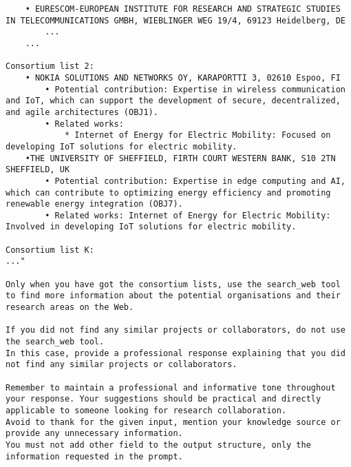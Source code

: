 \begin{lstlisting}
    • EURESCOM-EUROPEAN INSTITUTE FOR RESEARCH AND STRATEGIC STUDIES IN TELECOMMUNICATIONS GMBH, WIEBLINGER WEG 19/4, 69123 Heidelberg, DE
        ...
    ...

Consortium list 2:
    • NOKIA SOLUTIONS AND NETWORKS OY, KARAPORTTI 3, 02610 Espoo, FI
        • Potential contribution: Expertise in wireless communication and IoT, which can support the development of secure, decentralized, and agile architectures (OBJ1).
        • Related works:
            * Internet of Energy for Electric Mobility: Focused on developing IoT solutions for electric mobility.
    •THE UNIVERSITY OF SHEFFIELD, FIRTH COURT WESTERN BANK, S10 2TN SHEFFIELD, UK
        • Potential contribution: Expertise in edge computing and AI, which can contribute to optimizing energy efficiency and promoting renewable energy integration (OBJ7).
        • Related works: Internet of Energy for Electric Mobility: Involved in developing IoT solutions for electric mobility.
    
Consortium list K:
..."

Only when you have got the consortium lists, use the search_web tool to find more information about the potential organisations and their research areas on the Web. 

If you did not find any similar projects or collaborators, do not use the search_web tool.
In this case, provide a professional response explaining that you did not find any similar projects or collaborators.

Remember to maintain a professional and informative tone throughout your response. Your suggestions should be practical and directly applicable to someone looking for research collaboration.
Avoid to thank for the given input, mention your knowledge source or provide any unnecessary information.
You must not add other field to the output structure, only the information requested in the prompt.
\end{lstlisting}